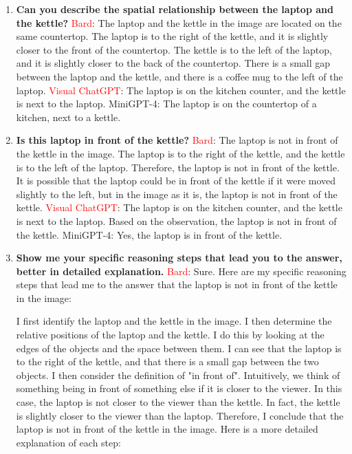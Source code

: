 \begin{enumerate}
    \item \textbf{Can you describe the spatial relationship between the laptop and the kettle?}
    \subitem \textcolor{Red}{Bard}: 
    The laptop and the kettle in the image are located on the same countertop. The laptop is to the right of the kettle, and it is slightly closer to the front of the countertop. The kettle is to the left of the laptop, and it is slightly closer to the back of the countertop. There is a small gap between the laptop and the kettle, and there is a coffee mug to the left of the laptop.
    \subitem \textcolor{red}{Visual ChatGPT}: The laptop is on the kitchen counter, and the kettle is next to the laptop.
    \subitem MiniGPT-4: The laptop is on the countertop of a kitchen, next to a kettle.
    \item \textbf{Is this laptop in front of the kettle?}
    \subitem \textcolor{Red}{Bard}: 
    The laptop is not in front of the kettle in the image. The laptop is to the right of the kettle, and the kettle is to the left of the laptop. Therefore, the laptop is not in front of the kettle. It is possible that the laptop could be in front of the kettle if it were moved slightly to the left, but in the image as it is, the laptop is not in front of the kettle.
    \subitem \textcolor{red}{Visual ChatGPT}: The laptop is on the kitchen counter, and the kettle is next to the laptop. Based on the observation, the laptop is not in front of the kettle.
    \subitem MiniGPT-4: Yes, the laptop is in front of the kettle.
    \item \textbf{Show me your specific reasoning steps that lead you to the answer, better in detailed explanation.}
    \subitem \textcolor{Red}{Bard}: Sure. Here are my specific reasoning steps that lead me to the answer that the laptop is not in front of the kettle in the image:

    I first identify the laptop and the kettle in the image.
    I then determine the relative positions of the laptop and the kettle. I do this by looking at the edges of the objects and the space between them. I can see that the laptop is to the right of the kettle, and that there is a small gap between the two objects.
    I then consider the definition of "in front of". Intuitively, we think of something being in front of something else if it is closer to the viewer. In this case, the laptop is not closer to the viewer than the kettle. In fact, the kettle is slightly closer to the viewer than the laptop.
    Therefore, I conclude that the laptop is not in front of the kettle in the image.
    Here is a more detailed explanation of each step:
    

\end{enumerate}
